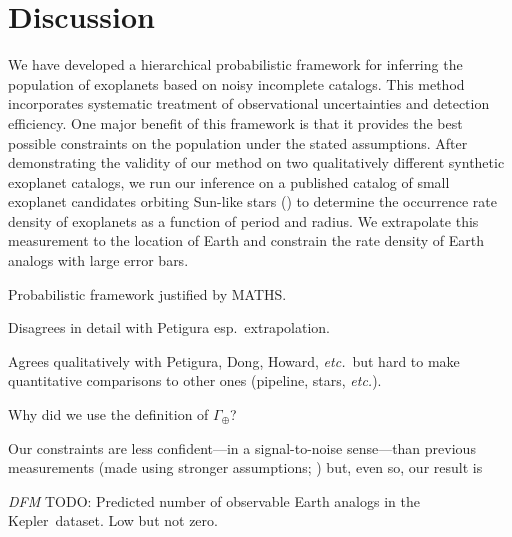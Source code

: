 \documentclass[12pt,preprint]{aastex}
\newcommand{\project}[1]{{\sffamily #1}}
\newcommand{\kepler}{\project{Kepler}}
\newcommand{\foreign}[1]{\emph{#1}}
\newcommand{\etc}{\foreign{etc.}}
\newcommand{\todo}[3]{{\color{#2} \emph{#1} TODO: #3}}
\newcommand{\dfmtodo}[1]{\todo{DFM}{red}{#1}}
\newcommand{\rate}{\ensuremath{\Gamma}}
\newcommand{\gammaearth}{{\ensuremath{\rate_\oplus}}}
\begin{document}
\section{Discussion}

We have developed a hierarchical probabilistic framework for inferring the
population of exoplanets based on noisy incomplete catalogs.
This method incorporates systematic treatment of observational uncertainties
and detection efficiency.
One major benefit of this framework is that it provides the best possible
constraints on the population under the stated assumptions.
After demonstrating the validity of our method on two qualitatively different
synthetic exoplanet catalogs, we run our inference on a published catalog of
small exoplanet candidates orbiting Sun-like stars (\citealt{petigura}) to
determine the occurrence rate density of exoplanets as a function of period
and radius.
We extrapolate this measurement to the location of Earth and constrain the
rate density of Earth analogs with large error bars.


Probabilistic framework justified by MATHS.

Disagrees in detail with Petigura esp.\ extrapolation.

Agrees qualitatively with Petigura, Dong, Howard, \etc\ but hard to make
quantitative comparisons to other ones (pipeline, stars, \etc).

Why did we use the definition of \gammaearth?

Our constraints are less confident---in a signal-to-noise sense---than
previous measurements (made using stronger assumptions; \citealt{petigura})
but, even so, our result is

\dfmtodo{%
Predicted number of observable Earth analogs in the \kepler\ dataset.
Low but not zero.
}
\end{document}
